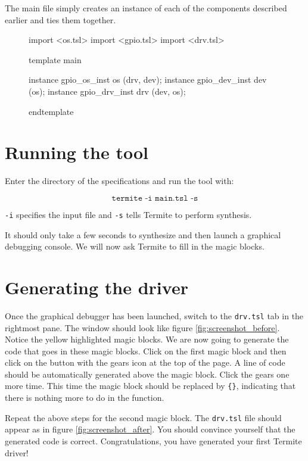 \documentclass{article}
\newcommand{\code}[1]{\texttt{#1}}
\begin{document}
The main file simply creates an instance of each of the components described earlier and ties them together.

\begin{figure}[H]
\lstset{numbers=left}
\begin{tsllisting}
import <os.tsl>
import <gpio.tsl>
import <drv.tsl>

template main

instance gpio_os_inst  os  (drv, dev);
instance gpio_dev_inst dev (os);
instance gpio_drv_inst drv (dev, os);

endtemplate
\end{tsllisting}
\end{figure}

\section{Running the tool}
\label{sec:running}

Enter the directory of the specifications and run the tool with:

\[\code{termite -i main.tsl -s}\]

\code{-i} specifies the input file and \code{-s} tells Termite to perform synthesis.

It should only take a few seconds to synthesize and then launch a graphical debugging console. We will now ask Termite to fill in the magic blocks. 

\section{Generating the driver}

Once the graphical debugger has been launched, switch to the \code{drv.tsl} tab in the rightmost pane. The window should look like figure \ref{fig:screenshot_before}. Notice the yellow highlighted magic blocks. We are now going to generate the code that goes in these magic blocks. Click on the first magic block and then click on the button with the gears icon at the top of the page. A line of code should be automatically generated above the magic block. Click the gears one more time. This time the magic block should be replaced by \code{\{\}}, indicating that there is nothing more to do in the function. 

Repeat the above steps for the second magic block. The \code{drv.tsl} file should appear as in figure \ref{fig:screenshot_after}. You should convince yourself that the generated code is correct. Congratulations, you have generated your first Termite driver!
\end{document}
